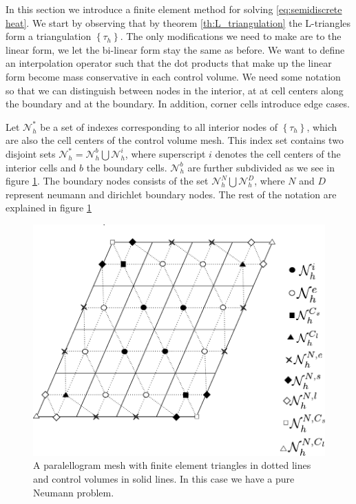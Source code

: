\documentclass[../Main/main.tex]{subfiles}
\begin{document}
	In this section we introduce a finite element method for solving \eqref{eq:semidiscrete heat}. We start by observing that by theorem \ref{th:L_triangulation} the L-triangles form a triangulation $\left \{ \tau_h \right \}$. The only modifications we need to make are to the linear form, we let the bi-linear form stay the same as before. We want to define an interpolation operator such that the dot products that make up the linear form become mass conservative in each control volume. We need some notation so that we can distinguish between nodes in the interior, at at cell centers along the boundary and at the boundary. In addition, corner cells introduce edge cases. 
	\par 
	Let $\mathcal{N}_h^*$ be a set of indexes corresponding to all interior nodes of $\left \{ \tau_h \right \}$, which are also the cell centers of the control volume mesh. This index set contains two disjoint sets $\mathcal{N}_h^* = \mathcal{N}_h^b \bigcup \mathcal{N}_h^i$, where superscript $i$ denotes the cell centers of the interior cells and $b$ the boundary cells. $\mathcal{N}^b_h$ are further subdivided as we see in figure \ref{fig:mesWithNodes}. The boundary nodes consists of the set $\mathcal{N}_h^N \bigcup \mathcal{N}_h^D$, where $N$ and $D$ represent neumann and dirichlet boundary nodes. The rest of the notation are explained in figure \ref{fig:mesWithNodes}
	\begin{figure}[H]
		\centering
		\includegraphics{meshWithNodes.pdf}

		\caption{A paralellogram mesh with finite element triangles in dotted lines and control volumes in solid lines. In this case we have a pure Neumann problem.}
		\label{fig:mesWithNodes}
	\end{figure}
\end{document}
